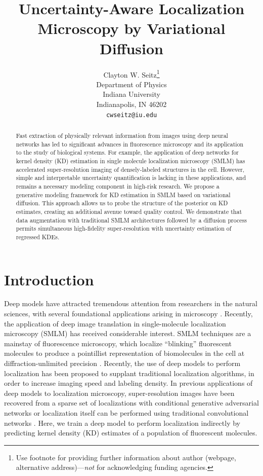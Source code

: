 \documentclass{article}
\title{Uncertainty-Aware Localization Microscopy by Variational Diffusion}
\author{%
  Clayton W. Seitz\thanks{Use footnote for providing further information
    about author (webpage, alternative address)---\emph{not} for acknowledging
    funding agencies.} \\
  Department of Physics\\
  Indiana University\\
  Indianapolis, IN 46202 \\
  \texttt{cwseitz@iu.edu} \\
}
\begin{document}
\maketitle


\begin{abstract}

Fast extraction of physically relevant information from images using deep neural networks has led to significant advances in fluorescence microscopy and its application to the study of biological systems. For example, the application of deep networks for kernel density (KD) estimation in single molecule localization microscopy (SMLM) has accelerated super-resolution imaging of densely-labeled structures in the cell. However, simple and interpretable uncertainty quantification is lacking in these applications, and remains a necessary modeling component in high-risk research. We propose a generative modeling framework for KD estimation in SMLM based on variational diffusion. This approach allows us to probe the structure of the posterior on KD estimates, creating an additional avenue toward quality control. We demonstrate that data augmentation with traditional SMLM architectures followed by a diffusion process permits simultaneous high-fidelity super-resolution with uncertainty estimation of regressed KDEs. 
\end{abstract}

\section{Introduction}

Deep models have attracted tremendous attention from researchers in the natural sciences, with several foundational applications arising in microscopy \citep{Weigert2018,Falk2019}. Recently, the application of deep image translation in single-molecule localization microscopy (SMLM) has received considerable interest. SMLM techniques are a mainstay of fluorescence microscopy, which localize ``blinking'' fluorescent molecules to produce a pointillist representation of biomolecules in the cell at diffraction-unlimited precision \citep{Rust2006,Betzig2006}. Recently, the use of deep models to perform localization has been proposed to supplant traditional localization algorithms, in order to increase imaging speed and labeling density. In previous applications of deep models to localization microscopy, super-resolution images have been recovered from a sparse set of localizations with conditional generative adversarial networks \citep{Ouyang2018} or localization itself can be performed using traditional convolutional networks \citep{Nehme2020,Speiser2021}. Here, we train a deep model to perform localization indirectly by predicting kernel density (KD) estimates of a population of fluorescent molecules. 
\end{document}
